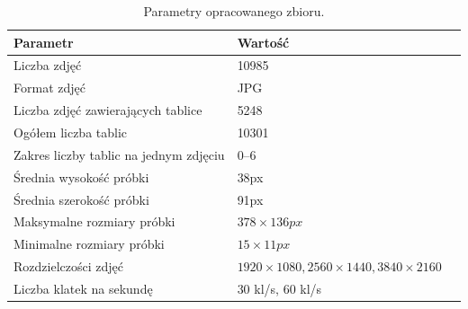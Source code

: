 \begin{table}[h]
    \centering
    \caption{Parametry opracowanego zbioru.}
    \begin{tabular}{l l l}
        \toprule
        \textbf{Parametr}                      & \textbf{Wartość}                                    \\
        \midrule
        Liczba zdjęć                           & 10985                                               \\
        Format zdjęć                           & JPG                                                 \\
        Liczba zdjęć zawierających tablice     & 5248                                                \\
        Ogółem liczba tablic                   & 10301                                               \\
        Zakres liczby tablic na jednym zdjęciu & 0--6                                                \\
        Średnia wysokość próbki                & 38px                                                \\
        Średnia szerokość próbki               & 91px                                                \\
        Maksymalne rozmiary próbki             & $378\times 136px$                                   \\
        Minimalne rozmiary próbki              & $15\times 11px$                                     \\
        Rozdzielczości zdjęć                   & $1920\times 1080, 2560\times 1440, 3840\times 2160$ \\
        Liczba klatek na sekundę               & 30 kl/s, 60 kl/s                                    \\
        \bottomrule
    \end{tabular}
    \label{tab:tab_data_set_characteristics}
\end{table}